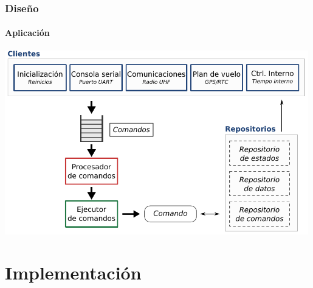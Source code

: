 \documentclass[xcolor=dvipsnames]{beamer}
\begin{document}
    \begin{frame}
        \frametitle{Diseño}
        \framesubtitle{Aplicación}
        
        \centering
        \includegraphics[width=0.99\textwidth]{img/arquitectura_suchai.pdf}
        
    \end{frame}
    
    \begin{frame}
        \centering \Large {}
        
    \end{frame}
    
    \section{Implementación}
\end{document}
